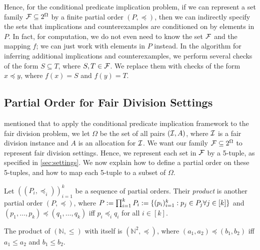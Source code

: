 Hence, for the conditional predicate implication problem,
if we can represent a set family $\mathcal{F} \subseteq 2^{\Omega}$
by a finite partial order $(P, \preceq)$,
then we can indirectly specify the sets that implications and counterexamples
are conditioned on by elements in $P$.
In fact, for computation, we do not even need to know the set $\mathcal{F}$ and the mapping $f$;
we can just work with elements in $P$ instead.
In the algorithm for inferring additional implications and counterexamples,
we perform several checks of the form $S \subseteq T$, where $S, T \in \mathcal{F}$.
We replace them with checks of the form $x \preceq y$, where $f(x) = S$ and $f(y) = T$.

\subsection{Partial Order for Fair Division Settings}

 mentioned that to apply the conditional predicate implication framework
to the fair division problem, we let $\Omega$ be the set of all pairs $(\mathcal{I}, A)$,
where $\mathcal{I}$ is a fair division instance and $A$ is an allocation for $\mathcal{I}$.
We want our family $\mathcal{F} \subseteq 2^{\Omega}$ to represent fair division settings.
Hence, we represent each set in $\mathcal{F}$ by a 5-tuple, as specified in \cref{sec:settings}.
We now explain how to define a partial order on these 5-tuples,
and how to map each 5-tuple to a subset of $\Omega$.

\begin{definition}
Let $((P_i, \preceq_i))_{i=1}^k$ be a sequence of partial orders.
Their \emph{product} is another partial order $(P, \preceq)$, where
$P := \prod_{i=1}^k P_i := \{(p_i)_{i=1}^k: p_j \in P_j \forall j \in [k]\}$
and $(p_1, \ldots, p_k) \preceq (q_1, \ldots, q_k)$ iff $p_i \preceq_i q_i$ for all $i \in [k]$.
\end{definition}

\begin{example}
The product of $(\mathbb{N}, \le)$ with itself is $(\mathbb{N}^2, \preceq)$,
where $(a_1, a_2) \preceq (b_1, b_2)$ iff $a_1 \le a_2$ and $b_1 \le b_2$.
\end{example}

